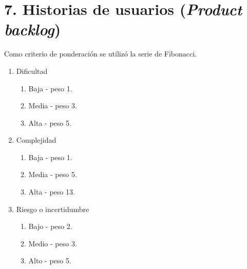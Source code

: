 \documentclass[
11pt, %
]{charter}
\begin{document}
\section{7. Historias de usuarios (\textit{Product backlog})}
\label{sec:backlog}

Como criterio de ponderación se utilizó la serie de Fibonacci.

\begin{enumerate}
	\item Dificultad
		\begin{enumerate}
			\item Baja - peso 1.
			\item Media - peso 3.
			\item Alta - peso 5.
		\end{enumerate}
	\item Complejidad
		\begin{enumerate}
			\item Baja - peso 1.
			\item Media - peso 5.
			\item Alta - peso 13.
		\end{enumerate}
	\item Riesgo o incertidumbre
		\begin{enumerate}
			\item Bajo - peso 2.
			\item Medio - peso 3.
			\item Alto - peso 5.
		\end{enumerate}
\end{enumerate}
\end{document}
